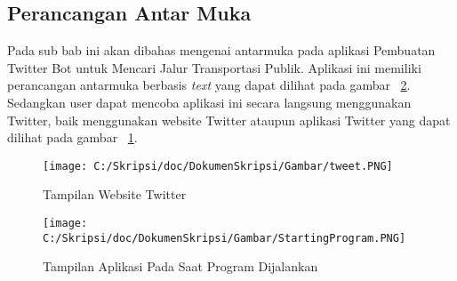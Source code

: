 \subsection{Perancangan Antar Muka}

Pada sub bab ini akan dibahas mengenai antarmuka pada aplikasi Pembuatan Twitter Bot untuk Mencari Jalur Transportasi Publik. Aplikasi ini memiliki perancangan antarmuka berbasis \textit{text} yang dapat dilihat pada gambar ~\ref{fig:StartingProgram}. Sedangkan user dapat mencoba aplikasi ini secara langsung menggunakan Twitter, baik menggunakan website Twitter ataupun aplikasi Twitter yang dapat dilihat pada gambar ~\ref{fig:tweet}.

\begin{figure}[htbp]
	\centering
		\texttt{[image: C:/Skripsi/doc/DokumenSkripsi/Gambar/tweet.PNG]}
	\caption{Tampilan Website Twitter}
	\label{fig:tweet}
\end{figure}

\begin{figure}
	\centering
		\texttt{[image: C:/Skripsi/doc/DokumenSkripsi/Gambar/StartingProgram.PNG]}
	\caption{Tampilan Aplikasi Pada Saat Program Dijalankan}
	\label{fig:StartingProgram}
\end{figure}


